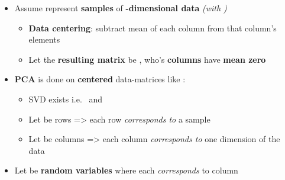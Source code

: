 \begin{itemize}

      \item
            Assume 
            represent \textbf{ samples} of \textbf{-dimensional
                  data} \emph{(with )}

            \begin{itemize}

                  \item
                        \textbf{Data centering}: subtract mean of each column from that
                        column's elements
                  \item
                        Let the \textbf{resulting matrix} be
                        , who's \textbf{columns} have
                        \textbf{mean zero}
            \end{itemize}
      \item
            \textbf{PCA} is done on \textbf{centered} data-matrices like
            :

            \begin{itemize}

                  \item
                        SVD exists i.e.~ and 
                  \item
                        Let  be rows
                        =\textgreater{} each row \emph{corresponds to} a sample
                  \item
                        Let  be columns
                        =\textgreater{} each column \emph{corresponds to} one dimension of
                        the data
            \end{itemize}
      \item
            Let  be \textbf{random variables} where
            each  \emph{corresponds} to column 

            \begin{itemize}


\end{itemize}
\end{itemize}

